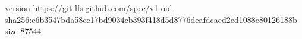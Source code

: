 version https://git-lfs.github.com/spec/v1
oid sha256:c6b3547bda58cc17bd9034cb393f418d5d8776deafdcaed2ed1088e80126188b
size 87544
